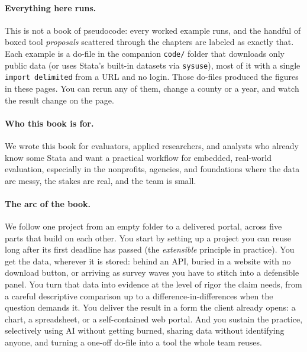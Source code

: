 \documentclass[
    a4paper,
    fontsize=10pt,
    twoside=true,
    numbers=noenddot,
]{kaobook}
\begin{document}
\paragraph{Everything here runs.} This is not a book of pseudocode: every worked example runs, and the handful of boxed tool \emph{proposals} scattered through the chapters are labeled as exactly that. Each example is a do-file in the companion \texttt{code/} folder that downloads only public data (or uses Stata's built-in datasets via \texttt{sysuse}), most of it with a single \texttt{import delimited} from a URL and no login. Those do-files produced the figures in these pages. You can rerun any of them, change a county or a year, and watch the result change on the page.

\paragraph{Who this book is for.} We wrote this book for evaluators, applied researchers, and analysts who already know some Stata and want a practical workflow for embedded, real-world evaluation, especially in the nonprofits, agencies, and foundations where the data are messy, the stakes are real, and the team is small.

\paragraph{The arc of the book.} We follow one project from an empty folder to a delivered portal, across five parts that build on each other. You start by setting up a project you can reuse long after its first deadline has passed (the \emph{extensible} principle in practice). You get the data, wherever it is stored: behind an API, buried in a website with no download button, or arriving as survey waves you have to stitch into a defensible panel. You turn that data into evidence at the level of rigor the claim needs, from a careful descriptive comparison up to a difference-in-differences when the question demands it. You deliver the result in a form the client already opens: a chart, a spreadsheet, or a self-contained web portal. And you sustain the practice, selectively using AI without getting burned, sharing data without identifying anyone, and turning a one-off do-file into a tool the whole team reuses.
\end{document}
